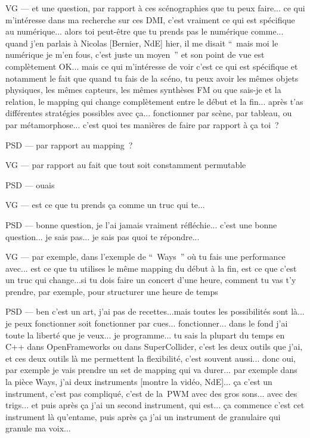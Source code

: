 VG — et une question, par rapport à ces scénographies que tu peux faire... ce qui m'intéresse dans ma recherche sur ces DMI, c'est vraiment ce qui est spécifique au numérique... alors toi peut-être que tu prends pas le numérique comme... quand j'en parlais à Nicolas [Bernier, NdE] hier, il me disait “ mais moi le numérique je m'en fous, c'est juste un moyen ” et son point de vue est complètement OK... mais ce qui m'intéresse de voir c'est ce qui est spécifique et notamment le fait que quand tu fais de la scéno, tu peux avoir les mêmes objets physiques, les mêmes capteurs, les mêmes synthèses FM ou que sais-je et la relation, le mapping qui change complètement entre le début et la fin... après t'as différentes stratégies possibles avec ça... fonctionner par scène, par tableau, ou par métamorphose... c'est quoi tes manières de faire par rapport à ça toi ?

PSD — par rapport au mapping ?

VG — par rapport au fait que tout soit constamment permutable

PSD — ouais

VG — est ce que tu prends ça comme un truc qui te...

PSD — bonne question, je l'ai jamais vraiment réfléchie... c'est une bonne question... je sais pas... je sais pas quoi te répondre...

VG — par exemple, dans l'exemple de “ Ways ” où tu fais une performance avec... est ce que tu utilises le même mapping du début à la fin, est ce que c'est un truc qui change...si tu dois faire un concert d'une heure, comment tu vas t'y prendre,  par exemple, pour structurer une heure de temps 

PSD — ben c'est un art, j'ai pas de recettes...mais toutes les possibilités sont là... je peux fonctionner soit fonctionner par cues... fonctionner... dans le fond j'ai toute la liberté que je veux... je programme... tu sais la plupart du temps en C++ dans OpenFrameworks ou dans SuperCollider, c'est les deux outils que j'ai, et ces deux outils là me permettent la flexibilité, c'est souvent aussi... donc oui, par exemple je vais prendre un set de mapping qui va durer... par exemple dans la pièce Ways, j'ai deux instruments [montre la vidéo, NdE]... ça c'est un instrument, c'est pas compliqué, c'est de la PWM avec des gros sons... avec des trigs... et puis après ça j'ai un second instrument, qui est... ça commence c'est cet instrument là qu'entame, puis après ça j'ai un instrument de granulaire qui granule ma voix...

